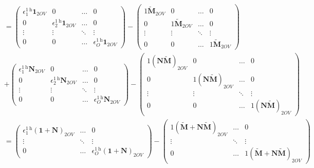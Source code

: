 \begin{align}
 &= \begin{pmatrix}
\epsilon^{1 \mathrm{~h}}_{1} \bm{1}_{2OV} & 0 & \dots & 0 \\[6pt]
0 & \epsilon^{1 \mathrm{~h}}_{2} \bm{1}_{2OV} & \dots & 0 \\[6pt]
\vdots & \vdots & \ddots & \vdots \\[6pt]
0 & 0 & \dots & \epsilon^{1 \mathrm{~h}}_{O} \bm{1}_{2OV}
\end{pmatrix} -  \begin{pmatrix}
1 \tilde{\bm{M}}_{2OV} & 0 & \dots & 0\\[6pt]
0 & 1 \tilde{\bm{M}}_{2OV} & \dots & 0\\[6pt]
\vdots & \vdots & \ddots & \vdots \\[6pt]
0 & 0 & \dots & 1 \tilde{\bm{M}}_{2OV}
\end{pmatrix}\\
&+ \begin{pmatrix}
\epsilon^{1 \mathrm{~h}}_{1} \bm{N}_{2OV} & 0 & \dots & 0 \\[6pt]
0 & \epsilon^{1 \mathrm{~h}}_{2} \bm{N}_{2OV} & \dots & 0 \\[6pt]
\vdots & \vdots & \ddots & \vdots \\[6pt]
0 & 0 & \dots & \epsilon^{1 \mathrm{~h}}_{O} \bm{N}_{2OV}   
\end{pmatrix} - \begin{pmatrix}
1 \left(\bm{N} \tilde{\bm{M}}\right)_{2OV} & 0 & \dots & 0\\[6pt]
0 & 1 \left(\bm{N} \tilde{\bm{M}}\right)_{2OV} & \dots & 0\\[6pt]
\vdots & \vdots & \ddots & \vdots \\[6pt]
0 & 0 & \dots &  1
    \left(\bm{N} \tilde{\bm{M}}\right)_{2OV}
\end{pmatrix}\\
&= \begin{pmatrix}
\epsilon^{1 \mathrm{~h}}_{1} \left(\bm{1} + \bm{N}\right)_{2OV} & \dots & 0 \\[6pt]
\vdots  & \ddots & \vdots \\[6pt]
0 & \dots & \epsilon^{1 \mathrm{~h}}_{O} \left(\bm{1} + \bm{N}\right)_{2OV}
\end{pmatrix} - \begin{pmatrix}
1 \left(\tilde{\bm{M}}+\bm{N} \tilde{\bm{M}}\right)_{2OV} & \dots & 0\\[6pt]
\vdots & \ddots & \vdots \\[6pt]
0 & \dots &  1 \left(\tilde{\bm{M}}+\bm{N} \tilde{\bm{M}}\right)_{2OV}

\end{pmatrix}
\end{align}
